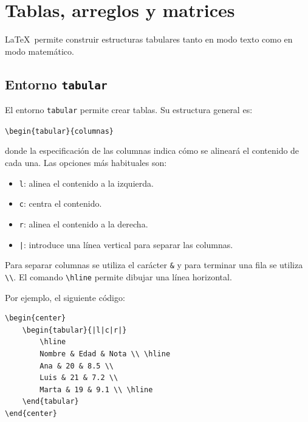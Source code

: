\documentclass[11pt,a4paper]{article}
\theoremstyle{plain}
\theoremstyle{definition}
\theoremstyle{remark}
\theoremstyle{exercise}
\begin{document}
\section{Tablas, arreglos y matrices}

\LaTeX\ permite construir estructuras tabulares tanto en modo texto como en modo matemático.

\subsection{Entorno \texttt{tabular}}

El entorno \verb|tabular| permite crear tablas. Su estructura general es:

\begin{center}
    \verb|\begin{tabular}{columnas}|
\end{center}

\noindent donde la especificación de las columnas indica cómo se alineará el contenido de cada una. Las opciones más habituales son:
\begin{itemize}
    \item \verb|l|: alinea el contenido a la izquierda.
    \item \verb|c|: centra el contenido.
    \item \verb|r|: alinea el contenido a la derecha.
    \item \texttt{|}: introduce una línea vertical para separar las columnas.
\end{itemize}

\noindent Para separar columnas se utiliza el carácter \verb|&| y para terminar una fila se utiliza \verb|\\|. El comando \verb|\hline| permite dibujar una línea horizontal.

\medskip

Por ejemplo, el siguiente código:

\begin{lstlisting}
\begin{center}
    \begin{tabular}{|l|c|r|}
        \hline
        Nombre & Edad & Nota \\ \hline
        Ana & 20 & 8.5 \\
        Luis & 21 & 7.2 \\
        Marta & 19 & 9.1 \\ \hline
    \end{tabular}
\end{center}
\end{lstlisting}
\end{document}
